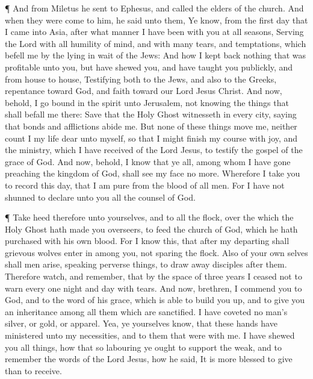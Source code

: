 ¶ And from Miletus he sent to Ephesus, and called the
elders of the church.  And when they were come to him, he
said unto them, Ye know, from the first day that I came into Asia, after
what manner I have been with you at all seasons,  Serving
the Lord with all humility of mind, and with many tears, and
temptations, which befell me by the lying in wait of the Jews:
 And how I kept back nothing that was profitable unto you,
but have shewed you, and have taught you publickly, and from house to
house,  Testifying both to the Jews, and also to the
Greeks, repentance toward God, and faith toward our Lord Jesus Christ.
 And now, behold, I go bound in the spirit unto Jerusalem,
not knowing the things that shall befall me there:  Save
that the Holy Ghost witnesseth in every city, saying that bonds and
afflictions abide me.  But none of these things move me,
neither count I my life dear unto myself, so that I might finish my
course with joy, and the ministry, which I have received of the Lord
Jesus, to testify the gospel of the grace of God.  And now,
behold, I know that ye all, among whom I have gone preaching the kingdom
of God, shall see my face no more.  Wherefore I take you to
record this day, that I am pure from the blood of all men. 
For I have not shunned to declare unto you all the counsel of God.

 ¶ Take heed therefore unto yourselves, and to all the
flock, over the which the Holy Ghost hath made you overseers, to feed
the church of God, which he hath purchased with his own blood.
 For I know this, that after my departing shall grievous
wolves enter in among you, not sparing the flock.  Also of
your own selves shall men arise, speaking perverse things, to draw away
disciples after them.  Therefore watch, and remember, that
by the space of three years I ceased not to warn every one night and day
with tears.  And now, brethren, I commend you to God, and
to the word of his grace, which is able to build you up, and to give you
an inheritance among all them which are sanctified.  I have
coveted no man's silver, or gold, or apparel.  Yea, ye
yourselves know, that these hands have ministered unto my necessities,
and to them that were with me.  I have shewed you all
things, how that so labouring ye ought to support the weak, and to
remember the words of the Lord Jesus, how he said, It is more blessed to
give than to receive.

